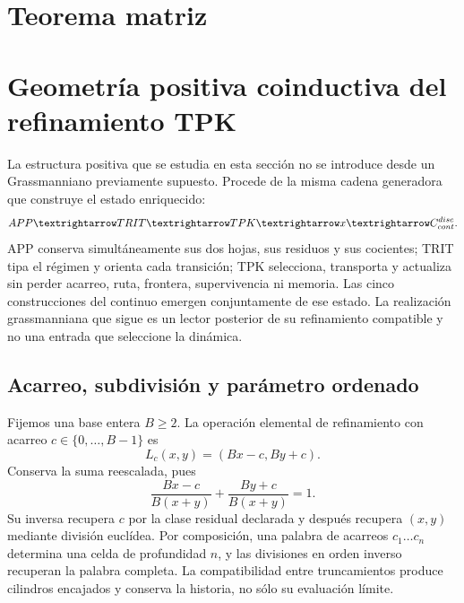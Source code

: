 \section{Teorema matriz}


\section{Geometría positiva coinductiva del refinamiento TPK}
\label{geometria_positiva:sec:geom-positiva-tpk}

La estructura positiva que se estudia en esta sección no se introduce desde
un Grassmanniano previamente supuesto. Procede de la misma cadena generadora
que construye el estado enriquecido:
\[
 \APP\longrightarrow\mathrm{TRIT}\longrightarrow\TPK
 \longrightarrow \widehat x
 \longrightarrow\mathcal C_{\rm cont}^{\rm disc}.
\]
APP conserva simultáneamente sus dos hojas, sus residuos y sus cocientes;
TRIT tipa el régimen y orienta cada transición; TPK selecciona, transporta y
actualiza sin perder acarreo, ruta, frontera, supervivencia ni memoria. Las
cinco construcciones del continuo emergen conjuntamente de ese estado. La
realización grassmanniana que sigue es un lector posterior de su refinamiento
compatible y no una entrada que seleccione la dinámica.

\subsection{Acarreo, subdivisión y parámetro ordenado}

Fijemos una base entera \(B\ge2\). La operación elemental de refinamiento con
acarreo \(c\in\{0,\ldots,B-1\}\) es
\begin{equation}
 L_c(x,y)=(Bx-c,By+c).
 \label{geometria_positiva:eq:carry-map-positive}
\end{equation}
Conserva la suma reescalada, pues
\[
 \frac{Bx-c}{B(x+y)}+\frac{By+c}{B(x+y)}=1.
\]
Su inversa recupera \(c\) por la clase residual declarada y después recupera
\((x,y)\) mediante división euclídea. Por composición, una palabra de acarreos
\(c_1\ldots c_n\) determina una celda de profundidad \(n\), y las divisiones
en orden inverso recuperan la palabra completa. La compatibilidad entre
truncamientos produce cilindros encajados y conserva la historia, no sólo su
evaluación límite.

